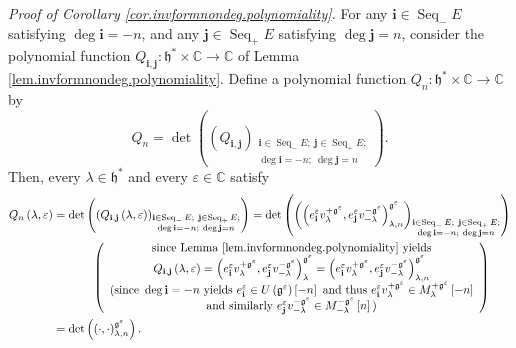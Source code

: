 \documentclass
[numbers=enddot,12pt,final,onecolumn,german,notitlepage]{scrartcl}%
\theoremstyle{definition}
\begin{document}
\textit{Proof of Corollary \ref{cor.invformnondeg.polynomiality}.} For any
$\mathbf{i}\in\operatorname*{Seq}\nolimits_{-}E$ satisfying $\deg
\mathbf{i}=-n$, and any $\mathbf{j}\in\operatorname*{Seq}\nolimits_{+}E$
satisfying $\deg\mathbf{j}=n$, consider the polynomial function $Q_{\mathbf{i}%
,\mathbf{j}}:\mathfrak{h}^{\ast}\times\mathbb{C}\rightarrow\mathbb{C}$ of
Lemma \ref{lem.invformnondeg.polynomiality}. Define a polynomial function
$Q_{n}:\mathfrak{h}^{\ast}\times\mathbb{C}\rightarrow\mathbb{C}$ by%
\[
Q_{n}=\det\left(  \left(  Q_{\mathbf{i},\mathbf{j}}\right)
_{\substack{\mathbf{i}\in\operatorname*{Seq}\nolimits_{-}E;\ \mathbf{j}%
\in\operatorname*{Seq}\nolimits_{+}E;\\\deg\mathbf{i}=-n;\ \deg\mathbf{j}%
=n}}\right)  .
\]
Then, every $\lambda\in\mathfrak{h}^{\ast}$ and every $\varepsilon
\in\mathbb{C}$ satisfy%
\begin{align*}
Q_{n}\left(  \lambda,\varepsilon\right)   &  =\det\left(  \left(
Q_{\mathbf{i},\mathbf{j}}\left(  \lambda,\varepsilon\right)  \right)
_{\substack{\mathbf{i}\in\operatorname*{Seq}\nolimits_{-}E;\ \mathbf{j}%
\in\operatorname*{Seq}\nolimits_{+}E;\\\deg\mathbf{i}=-n;\ \deg\mathbf{j}%
=n}}\right)  =\det\left(  \left(  \left(  e_{\mathbf{i}}^{\varepsilon
}v_{\lambda}^{+\mathfrak{g}^{\varepsilon}},e_{\mathbf{j}}^{\varepsilon
}v_{-\lambda}^{-\mathfrak{g}^{\varepsilon}}\right)  _{\lambda,n}%
^{\mathfrak{g}^{\varepsilon}}\right)  _{\substack{\mathbf{i}\in
\operatorname*{Seq}\nolimits_{-}E;\ \mathbf{j}\in\operatorname*{Seq}%
\nolimits_{+}E;\\\deg\mathbf{i}=-n;\ \deg\mathbf{j}=n}}\right) \\
&  \ \ \ \ \ \ \ \ \ \ \left(
\begin{array}
[c]{c}%
\text{since Lemma \ref{lem.invformnondeg.polynomiality} yields}\\
Q_{\mathbf{i},\mathbf{j}}\left(  \lambda,\varepsilon\right)  =\left(
e_{\mathbf{i}}^{\varepsilon}v_{\lambda}^{+\mathfrak{g}^{\varepsilon}%
},e_{\mathbf{j}}^{\varepsilon}v_{-\lambda}^{-\mathfrak{g}^{\varepsilon}%
}\right)  _{\lambda}^{\mathfrak{g}^{\varepsilon}}=\left(  e_{\mathbf{i}%
}^{\varepsilon}v_{\lambda}^{+\mathfrak{g}^{\varepsilon}},e_{\mathbf{j}%
}^{\varepsilon}v_{-\lambda}^{-\mathfrak{g}^{\varepsilon}}\right)  _{\lambda
,n}^{\mathfrak{g}^{\varepsilon}}\\
\text{(since }\deg\mathbf{i}=-n\text{ yields }e_{\mathbf{i}}^{\varepsilon}\in
U\left(  \mathfrak{g}^{\varepsilon}\right)  \left[  -n\right]  \text{ and thus
}e_{\mathbf{i}}^{\varepsilon}v_{\lambda}^{+\mathfrak{g}^{\varepsilon}}\in
M_{\lambda}^{+\mathfrak{g}^{\varepsilon}}\left[  -n\right] \\
\text{and similarly }e_{\mathbf{j}}^{\varepsilon}v_{-\lambda}^{-\mathfrak{g}%
^{\varepsilon}}\in M_{-\lambda}^{-\mathfrak{g}^{\varepsilon}}\left[  n\right]
\text{)}%
\end{array}
\right) \\
&  =\det\left(  \left(  \cdot,\cdot\right)  _{\lambda,n}^{\mathfrak{g}%
^{\varepsilon}}\right)  .
\end{align*}
\end{document}
